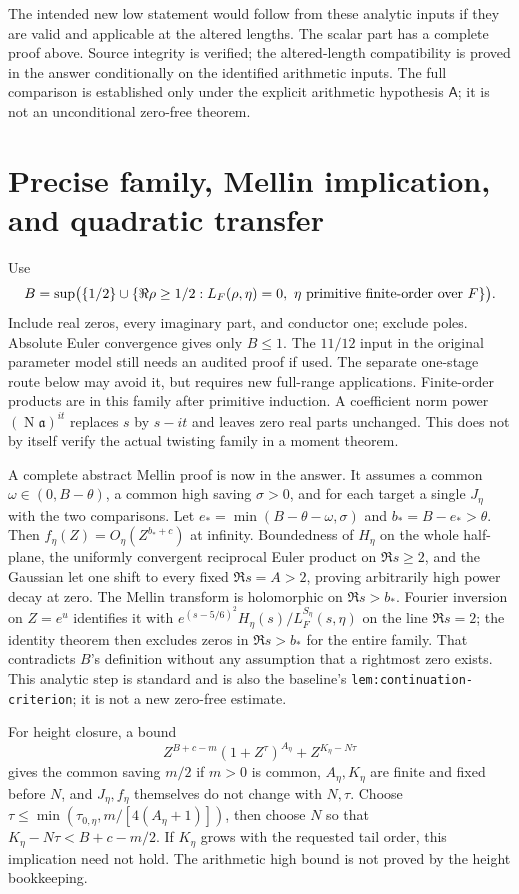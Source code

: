 \documentclass[12pt]{article}
\newcommand{\N}{\operatorname{N}}
\begin{document}
The intended new low statement would follow from these analytic
inputs if they are valid and applicable at the altered lengths.
The scalar part has a complete proof above.  Source integrity is verified; the altered-length compatibility is
proved in the answer conditionally on the identified arithmetic inputs.
The full comparison is established only under the explicit arithmetic
hypothesis \(\mathsf A\); it is not an unconditional zero-free theorem.

\section{Precise family, Mellin implication, and quadratic transfer}
Use
\[
 B=\sup\bigl(\{1/2\}\cup\{\Re\rho\ge1/2:
 L_F(\rho,\eta)=0,\ 
 \eta\hbox{ primitive finite-order over }F\}\bigr).
\]
Include real zeros, every imaginary part, and conductor one;
exclude poles.  Absolute Euler convergence gives only \(B\le1\).
The \(11/12\) input in the original parameter model still needs
an audited proof if used.  The separate one-stage route below may
avoid it, but requires new full-range applications.  Finite-order products are in this family after primitive
induction.  A coefficient norm power \((\N\mathfrak a)^{it}\)
replaces \(s\) by \(s-it\) and leaves zero real parts unchanged.
This does not by itself verify the actual twisting family in a
moment theorem.

A complete abstract Mellin proof is now in the answer.  It assumes
a common \(\omega\in(0,B-\theta)\), a common high saving \(\sigma>0\),
and for each target a single \(J_\eta\) with the two comparisons.
Let \(e_*=\min(B-\theta-\omega,\sigma)\) and \(b_*=B-e_*>\theta\).
Then \(f_\eta(Z)=O_\eta(Z^{b_*+c})\) at infinity.
Boundedness of \(H_\eta\) on the whole half-plane, the uniformly
convergent reciprocal Euler product on \(\Re s\ge2\), and the
Gaussian let one shift to every fixed \(\Re s=A>2\), proving
arbitrarily high power decay at zero.
The Mellin transform is holomorphic on \(\Re s>b_*\).
Fourier inversion on \(Z=e^u\) identifies it with
\(e^{(s-5/6)^2}H_\eta(s)/L_F^{S_\eta}(s,\eta)\) on the line
\(\Re s=2\); the identity theorem then excludes zeros in
\(\Re s>b_*\) for the entire family.  That contradicts \(B\)'s
definition without any assumption that a rightmost zero exists.
This analytic step is standard and is also the baseline's
\nolinkurl{lem:continuation-criterion}; it is not a new zero-free
estimate.

For height closure, a bound
\[
 Z^{B+c-m}(1+Z^\tau)^{A_\eta}+Z^{K_\eta-N\tau}
\]
gives the common saving \(m/2\) if \(m>0\) is common,
\(A_\eta,K_\eta\) are finite and fixed before \(N\), and
\(J_\eta,f_\eta\) themselves do not change with \(N,\tau\).
Choose
\(\tau\le\min(\tau_{0,\eta},m/[4(A_\eta+1)])\), then choose
\(N\) so that \(K_\eta-N\tau<B+c-m/2\).
If \(K_\eta\) grows with the requested tail order, this implication
need not hold.  The arithmetic high bound is not proved by the
height bookkeeping.
\end{document}
